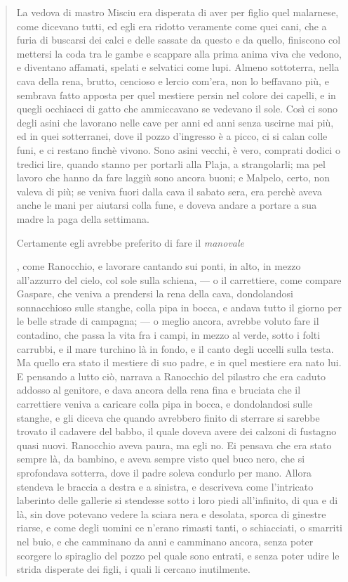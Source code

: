 \documentclass{book}
\newcounter{mar}
\newcommand{\mar}[2]{
\addtocounter{mar}{1}
\hspace{-0.73em}\textsuperscript{\hyperref[\thechapter.\themar]{\themar}}\marginpar{\footnotesize\textbf{\themar}\label{\thechapter.\themar}. #2}\hspace{-0.4em}
}
\newcommand{\mat}[1]{\mar{gg}{#1}}
\begin{document}
\begin{quote}
 La vedova di mastro Misciu era disperata di aver per figlio quel malarnese, come dicevano tutti, ed egli era ridotto veramente come quei cani, che a furia di buscarsi dei calci e delle sassate da questo e da quello, finiscono col mettersi la coda tra le gambe e scappare alla prima anima viva che vedono, e diventano affamati, spelati e selvatici come lupi. Almeno sottoterra, nella cava della rena, brutto, cencioso e lercio com’era, non lo beffavano più, e sembrava fatto apposta per quel mestiere persin nel colore dei capelli, e in quegli occhiacci di gatto che ammiccavano se vedevano il sole. Così ci sono degli asini che lavorano nelle cave per anni ed anni senza uscirne mai più, ed in quei sotterranei, dove il pozzo d’ingresso è a picco, ci si calan colle funi, e ci restano finchè vivono. Sono asini vecchi, è vero, comprati dodici o tredici lire, quando stanno per portarli alla Plaja, a strangolarli; ma pel lavoro che hanno da fare laggiù sono ancora buoni; e Malpelo, certo, non valeva di più; se veniva fuori dalla cava il sabato sera, era perchè aveva anche le mani per aiutarsi colla fune, e doveva andare a portare a sua madre la paga della settimana.
 
 Certamente egli avrebbe preferito di fare il \textit{manovale}\mat{si vede l'ideale di vita di Malpelo: \emph{non
   sottoterra}}, come Ranocchio, e lavorare cantando sui ponti, in alto, in mezzo all’azzurro del cielo, col sole sulla schiena, — o il carrettiere, come compare Gaspare, che veniva a prendersi la rena della cava, dondolandosi sonnacchioso sulle stanghe, colla pipa in bocca, e andava tutto il giorno per le belle strade di campagna; — o meglio ancora, avrebbe voluto fare il contadino, che passa la vita fra i campi, in mezzo al verde, sotto i folti carrubbi, e il mare turchino là in fondo, e il canto degli uccelli sulla testa. Ma quello era stato il mestiere di suo padre, e in quel mestiere era nato lui. E pensando a lutto ciò, narrava a Ranocchio del pilastro che era caduto addosso al genitore, e dava ancora della rena fina e bruciata che il carrettiere veniva a caricare colla pipa in bocca, e dondolandosi sulle stanghe, e gli diceva che quando avrebbero finito di sterrare si sarebbe trovato il cadavere del babbo, il quale doveva avere dei calzoni di fustagno quasi nuovi. Ranocchio aveva paura, ma egli no. Ei pensava che era stato sempre là, da bambino, e aveva sempre visto quel buco nero, che si sprofondava sotterra, dove il padre soleva condurlo per mano. Allora stendeva le braccia a destra e a sinistra, e descriveva come l’intricato laberinto delle gallerie si stendesse sotto i loro piedi all’infinito, di qua e di là, sin dove potevano vedere la sciara nera e desolata, sporca di ginestre riarse, e come degli uomini ce n’erano rimasti tanti, o schiacciati, o smarriti nel buio, e che camminano da anni e camminano ancora, senza poter scorgere lo spiraglio del pozzo pel quale sono entrati, e senza poter udire le strida disperate dei figli, i quali li cercano inutilmente.
 

\end{quote}
\end{document}
